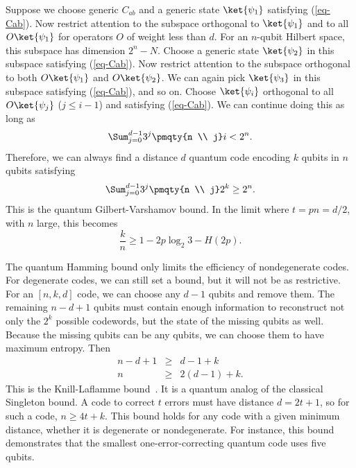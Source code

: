 Suppose we choose generic $C_{ab}$ and a generic state $\ket{\psi_1}$
satisfying (\ref{eq-Cab}).  Now restrict attention to the subspace
orthogonal to $\ket{\psi_1}$ and to all $O \ket{\psi_1}$ for operators $O$ of
weight less than $d$.  For an $n$-qubit Hilbert space, this subspace has
dimension $2^n - N$.  Choose a generic state $\ket{\psi_2}$ in this subspace
satisfying (\ref{eq-Cab}).  Now restrict attention to the subspace
orthogonal to both $O \ket{\psi_1}$ and $O \ket{\psi_2}$.  We can again
pick $\ket{\psi_3}$ in this subspace satisfying (\ref{eq-Cab}), and so on.
Choose $\ket{\psi_i}$ orthogonal to all $O \ket{\psi_j}$ ($j \leq i-1$) and
satisfying (\ref{eq-Cab}).  We can continue doing this as long as
\begin{equation}
	\Sum_{j=0}^{d-1} 3^j \pmqty{n \\ j} i < 2^n.
\end{equation}
Therefore, we can always find a distance $d$ quantum code encoding $k$
qubits in $n$ qubits satisfying
\begin{equation}
	\Sum_{j=0}^{d-1} 3^j \pmqty{n \\ j} 2^k \geq 2^n.
	\label{eq-QGV}
\end{equation}
This is the quantum Gilbert-Varshamov bound.  In the limit where $t = pn
= d/2$, with $n$ large, this becomes
\begin{equation}
	\frac{k}{n} \geq 1 - 2p \log_2 3 - H(2p).
\end{equation}

The quantum Hamming bound only limits the efficiency of nondegenerate
codes.  For degenerate codes, we can still set a bound, but it will not be as
restrictive.  For an $[n, k, d]$ code, we can choose any $d-1$ qubits and
remove them.  The remaining $n-d+1$ qubits must contain enough
information to reconstruct not only the $2^k$ possible codewords, but the state
of the missing qubits as well.  Because the missing qubits can be any
qubits, we can choose them to have maximum entropy.  Then
\begin{eqnarray}
	n-d+1 & \geq & d-1+k \\
	n & \geq & 2(d-1) + k.
\end{eqnarray}
This is the Knill-Laflamme bound~\cite{knill-laflamme-theory,cerf-cleve}.
It is a quantum analog of the classical Singleton bound.
A code to correct $t$ errors must have distance $d=2t+1$, so for such a
code, $n \geq 4t + k$.  This bound holds for any code with a given
minimum distance, whether it is degenerate or nondegenerate.  For
instance, this bound demonstrates that the smallest one-error-correcting
quantum code uses five qubits.

